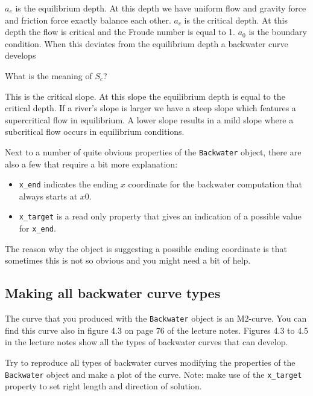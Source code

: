 \documentclass[a4paper]{article}
\begin{document}
\begin{solution}
    $a_e$ is the equilibrium depth. At this depth we have uniform flow and gravity force and friction force exactly balance each other.
    $a_c$ is the critical depth. At this depth the flow is critical and the Froude number is equal to 1.
    $a_0$ is the boundary condition. When this deviates from the equilibrium depth a backwater curve develops
\end{solution}

\begin{exercise}
  What is the meaning of $S_c$?
\end{exercise}

\begin{solution}
    This is the critical slope. At this slope the equilibrium depth is equal to the critical depth. If a river's slope is larger we have a steep slope which features a supercritical flow in equilibrium. A lower slope results in a mild slope where a subcritical flow occurs in equilibrium conditions.
\end{solution}
Next to a number of quite obvious properties of the \lstinline{Backwater} object, there are also a few that require a bit more explanation:
\begin{itemize}
  \item \lstinline{x_end} indicates the ending $x$ coordinate for the backwater computation that always starts at $x0$. 
  \item \lstinline{x_target} is a read only property that gives an indication of a possible value for \lstinline{x_end}. 
\end{itemize}
The reason why the object is suggesting a possible ending coordinate is that sometimes this is not so obvious and you might need a bit of help.

\subsection{Making all backwater curve types}
The curve that you produced with the \lstinline{Backwater} object is an M2-curve. You can find this curve also in figure 4.3 on page 76 of the lecture notes. Figures 4.3 to 4.5 in the lecture notes show all the types of backwater curves that can develop.

\begin{exercise}
  Try to reproduce all types of backwater curves modifying the properties of the \lstinline{Backwater} object and make a plot of the curve. Note: make use of the \lstinline=x_target= property to set right length and direction of solution.
\end{exercise}
\end{document}
